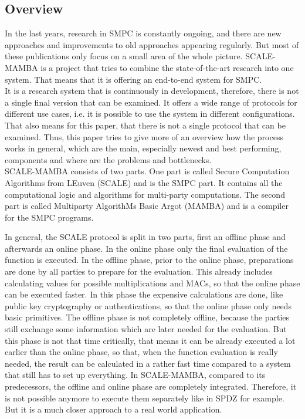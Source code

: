 \documentclass[english,runningheads,a4paper]{llncs}[2018/03/10]
\begin{document}
\subsection{Overview}

In the last years, research in SMPC is constantly ongoing, and there are new approaches and improvements to old approaches appearing regularly. But most of these publications only focus on a small area of the whole picture. SCALE-MAMBA\cite{ScaleMambaDocu} is a project that tries to combine the state-of-the-art research into one system. That means that it is offering an end-to-end system for SMPC.\\
It is a research system that is continuously in development, therefore, there is not a single final version that can be examined. It offers a wide range of protocols for different use cases, i.e. it is possible to use the system in different configurations. That also means for this paper, that there is not a single protocol that can be examined. Thus, this paper tries to give more of an overview how the process works in general, which are the main, especially newest and best performing, components and where are the problems and bottlenecks.\\ 
SCALE-MAMBA consists of two parts. One part is called Secure Computation Algorithms from LEuven (SCALE) and is the SMPC part. It contains all the computational logic and algorithms for multi-party computations. The second part is called Multiparty AlgorithMs Basic Argot (MAMBA) and is a compiler for the SMPC programs.

In general, the SCALE protocol is split in two parts, first an offline phase and afterwards an online phase. In the online phase only the final evaluation of the function is executed. In the offline phase, prior to the online phase, preparations are done by all parties to prepare for the evaluation. This already includes calculating values for possible multiplications and MACs, so that the online phase can be executed faster. In this phase the expensive calculations are done, like public key cryptography or authentications, so that the online phase only needs basic primitives. The offline phase is not completely offline, because the parties still exchange some information which are later needed for the evaluation. But this phase is not that time critically, that means it can be already executed a lot earlier than the online phase, so that, when the function evaluation is really needed, the result can be calculated in a rather fast time compared to a system that still has to set up everything. In SCALE-MAMBA, compared to its predecessors, the offline and online phase are completely integrated. Therefore, it is not possible anymore to execute them separately like in SPDZ for example. But it is a much closer approach to a real world application.\\
\end{document}
